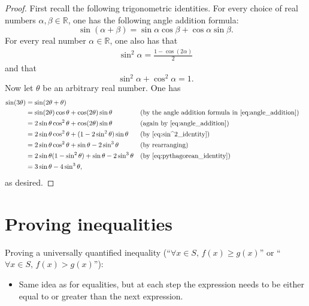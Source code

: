 \documentclass[11pt]{article}
\theoremstyle{plain}
\theoremstyle{plain}
\theoremstyle{remark}
\def\reals{\mathbb{R}}
\begin{document}
\begin{proof}
 First recall the following trigonometric identities. For every choice of real numbers $\alpha,\beta\in\reals$, one has the following angle addition formula:
 \begin{equation*}\tag{$\ast$}\label{eq:angle_addition}
  \sin(\alpha+\beta) = \sin \alpha \cos \beta + \cos \alpha \sin \beta.
 \end{equation*}
For every real number $\alpha\in\reals$, one also has that
 \begin{align*}
\sin^2\alpha = \frac{1-\cos(2\alpha)}{2} \tag{$\ast\ast$}\label{eq:sin^2_identity}
 \end{align*}
 and that
 \begin{equation*}\label{eq:pythagorean_identity}
  \sin^2\alpha + \cos^2\alpha = 1. \tag{$\ast\ast\ast$}
 \end{equation*}
 Now let $\theta$ be an arbitrary real number. One has
 \begin{align*}
  \sin(3\theta) & = \sin(2\theta+\theta) \\
    & = \sin(2\theta)\cos\theta + \cos(2\theta)\sin\theta &&\text{(by the angle addition formula in \eqref{eq:angle_addition})}\\
    & = 2\sin\theta\cos^2\theta + \cos(2\theta)\sin\theta &&\text{(again by \eqref{eq:angle_addition})}\\
    & = 2\sin\theta\cos^2\theta + (1-2\sin^2\theta)\sin\theta && \text{(by \eqref{eq:sin^2_identity})}\\
    & = 2\sin\theta\cos^2\theta + \sin\theta-2\sin^3\theta &&\text{(by rearranging)}\\
    & = 2\sin\theta(1-\sin^2\theta) + \sin\theta-2\sin^3\theta &&\text{(by \eqref{eq:pythagorean_identity})}\\
    & = 3\sin\theta - 4\sin^3\theta,
 \end{align*}
as desired. 
\end{proof}

\section*{Proving inequalities}

Proving a universally quantified inequality (``$\forall x\in S,\, f(x)\geq g(x)$'' or ``$\forall x\in S,\, f(x)>g(x)$''):
\begin{itemize}
 \item Same idea as for equalities, but at each step the expression needs to be either equal to or greater than the next expression.
\end{itemize}
\end{document}
